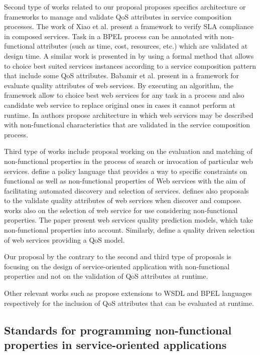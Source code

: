 Second type of works related to our proposal proposes specifics architecture or frameworks to manage and validate QoS attributes in service composition processes. The work of Xiao et al. \cite{XiaoCZBOLH08} present a framework to verify SLA compliance in composed services. Task in a BPEL process can be annotated with non-functional attributes (such as time, cost, resources, etc.) which are validated at design time. A similar work is presented in \cite{SchmelingCM11} by using a formal method that allows to choice best suited services instances according to a service composition pattern that include some QoS attributes. Babamir et al. present in \cite{Babamir2010} a framework for evaluate quality attributes of web services. By executing an algorithm, the framework allow to choice best web services for any task in a process and also candidate web service to replace original ones in cases it cannot perform at runtime. In \cite{Karunamurthy2012787} authors propose architecture in which web services may be described with non-functional characteristics that are validated in the service composition process.

Third type of works include proposal working on the evaluation and matching of non-functional properties in the process of search or invocation of particular web services.\cite{AgarwalLS09} define a policy language that provides a way to specific constraints on functional as well as non-functional properties of Web services with the aim of facilitating automated discovery and selection of services.\cite{JeongCL09,Kamalabad2012} defines also proposals to the validate quality attributes of web services when discover and compose.\cite{MohantyRP10} works also on the selection of web service for use considering non-functional properties. The paper present web services quality prediction models, which take non-functional properties into account. Similarly, \cite{Yeom2006} define a quality driven selection of web services providing a QoS model.

Our proposal by the contrary to the second and third type of proposals is focusing on the design of service-oriented application with non-functional properties and not on the validation of QoS attributes at runtime.

Other relevant works such as \cite{DAmbrogio06,Liu20121080} propose extensions to WSDL and BPEL languages respectively for the inclusion of QoS attributes that can be evaluated at runtime.

\subsection{Standards for programming non-functional properties in service-oriented applications}

